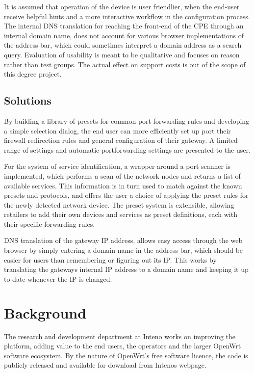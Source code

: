 \documentclass[a4paper,11pt,makeidx]{kth-bcs}
\begin{document}
It is assumed that operation of the device is user friendlier, when the end-user receive helpful hints and a more interactive workflow in the configuration process.
The internal DNS translation for reaching the front-end of the CPE through an internal domain name, does not account for various browser implementations of the address bar, which could sometimes interpret a domain address as a search query.
Evaluation of usability is meant to be qualitative and focuses on reason rather than test groups.
The actual effect on support costs is out of the scope of this degree project.

\section{Solutions}
By building a library of presets for common port forwarding rules and developing a simple selection dialog, the end user can more efficiently set up port their firewall redirection rules and general configuration of their gateway.
A limited range of settings and automatic portforwarding settings are presented to the user.

For the system of service identification, a wrapper around a port scanner is implemented, which performs a scan of the network nodes and returns a list of available services.
This information is in turn used to match against the known presets and protocols, and offers the user a choice of applying the preset rules for the newly detected network device.
The preset system is extensible, allowing retailers to add their own devices and services as preset definitions, each with their specific forwarding rules.

DNS translation of the gateway IP address, allows easy access through the web browser by simply entering a domain name in the address bar, which should be easier for users than remembering or figuring out its IP.
This works by translating the gateways internal IP address to a domain name and keeping it up to date whenever the IP is changed.

\chapter{Background}

The research and development department at Inteno works on improving the platform, adding value to the end users, the operators and the larger OpenWrt software ecosystem.
By the nature of OpenWrt's free software licence\cite{gnu-license}, the code is publicly released and available for download from Intenos webpage.\cite{inteno_gpl}
\end{document}
